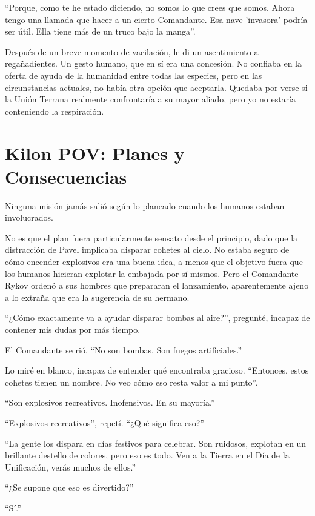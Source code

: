\documentclass[spanish,12pt,a4paper,oneside,titlepage]{book}
\begin{document}
    ``Porque, como te he estado diciendo, no somos lo que crees que somos. Ahora tengo una llamada que hacer a un cierto Comandante. Esa nave 'invasora' podría ser útil. Ella tiene más de un truco bajo la manga''.

    Después de un breve momento de vacilación, le di un asentimiento a regañadientes. Un gesto humano, que en sí era una concesión. No confiaba en la oferta de ayuda de la humanidad entre todas las especies, pero en las circunstancias actuales, no había otra opción que aceptarla. Quedaba por verse si la Unión Terrana realmente confrontaría a su mayor aliado, pero yo no estaría conteniendo la respiración.

    \chapter{Kilon POV: Planes y Consecuencias}

    Ninguna misión jamás salió según lo planeado cuando los humanos estaban involucrados.

    No es que el plan fuera particularmente sensato desde el principio, dado que la distracción de Pavel implicaba disparar cohetes al cielo. No estaba seguro de cómo encender explosivos era una buena idea, a menos que el objetivo fuera que los humanos hicieran explotar la embajada por sí mismos. Pero el Comandante Rykov ordenó a sus hombres que prepararan el lanzamiento, aparentemente ajeno a lo extraña que era la sugerencia de su hermano.

    ``¿Cómo exactamente va a ayudar disparar bombas al aire?'', pregunté, incapaz de contener mis dudas por más tiempo.

    El Comandante se rió. ``No son bombas. Son fuegos artificiales.''

    Lo miré en blanco, incapaz de entender qué encontraba gracioso. ``Entonces, estos cohetes tienen un nombre. No veo cómo eso resta valor a mi punto''.

    ``Son explosivos recreativos. Inofensivos. En su mayoría.''

    ``Explosivos recreativos'', repetí. ``¿Qué significa eso?''

    ``La gente los dispara en días festivos para celebrar. Son ruidosos, explotan en un brillante destello de colores, pero eso es todo. Ven a la Tierra en el Día de la Unificación, verás muchos de ellos.''

    ``¿Se supone que eso es divertido?''

    ``Sí.''
\end{document}

